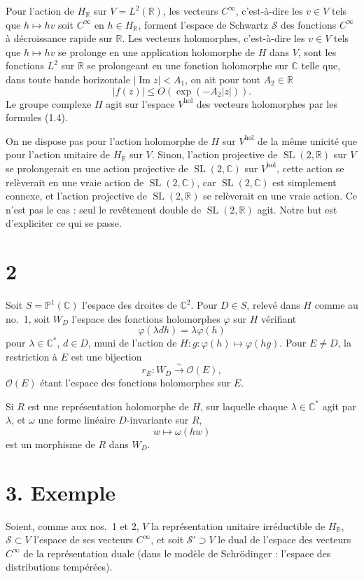 \documentclass[11pt]{article}
\newcommand{\C}{\mathbb C}
\newcommand{\R}{\mathbb R}
\newcommand{\cO}{\mathcal O}
\DeclareMathOperator{\SL}{SL}
\begin{document}
Pour l'action de $H_\R$ sur $V=L^2(\R)$, les vecteurs $C^\infty$, c'est-à-dire les $v\in V$ tels que $h\mapsto hv$ soit $C^\infty$ en $h\in H_\R$, forment l'espace de Schwartz $\mathscr S$ des fonctions $C^\infty$ à décroissance rapide sur $\R$. Les vecteurs holomorphes, c'est-à-dire les $v\in V$ tels que $h\mapsto hv$ se prolonge en une application holomorphe de $H$ dans $V$, sont les fonctions $L^2$ sur $\R$ se prolongeant en une fonction holomorphe sur $\C$ telle que, dans toute bande horizontale $|\operatorname{Im}z|<A_1$, on ait pour tout $A_2\in\R$
\[
|f(z)|\le O(\exp(-A_2|z|)).
\]
Le groupe complexe $H$ agit sur l'espace $V^{\mathrm{hol}}$ des vecteurs holomorphes par les formules (1.4).

On ne dispose pas pour l'action holomorphe de $H$ sur $V^{\mathrm{hol}}$ de la même unicité que pour l'action unitaire de $H_\R$ sur $V$. Sinon, l'action projective de $\SL(2,\R)$ sur $V$ se prolongerait en une action projective de $\SL(2,\C)$ sur $V^{\mathrm{hol}}$, cette action se relèverait en une vraie action de $\SL(2,\C)$, car $\SL(2,\C)$ est simplement connexe, et l'action projective de $\SL(2,\R)$ se relèverait en une vraie action. Ce n'est pas le cas : seul le revêtement double de $\SL(2,\R)$ agit. Notre but est d'expliciter ce qui se passe.

\section*{2}
Soit $S=\mathbb P^1(\C)$ l'espace des droites de $\C^2$. Pour $D\in S$, relevé dans $H$ comme au no.~1, soit $W_D$ l'espace des fonctions holomorphes $\varphi$ sur $H$ vérifiant
\[
\varphi(\lambda d h)=\lambda\varphi(h)
\]
pour $\lambda\in\C^*$, $d\in D$, muni de l'action de $H:g:\varphi(h)\mapsto\varphi(hg)$. Pour $E\ne D$, la restriction à $E$ est une bijection
\begin{equation}\tag{2.1}
r_E:W_D\xrightarrow{\sim}\cO(E),
\end{equation}
$\cO(E)$ étant l'espace des fonctions holomorphes sur $E$.

Si $R$ est une représentation holomorphe de $H$, sur laquelle chaque $\lambda\in\C^*$ agit par $\lambda$, et $\omega$ une forme linéaire $D$-invariante sur $R$,
\begin{equation}\tag{2.2}
w\longmapsto\omega(hw)
\end{equation}
est un morphisme de $R$ dans $W_D$.

\section*{3. Exemple}
Soient, comme aux nos.~1 et 2, $V$ la représentation unitaire irréductible de $H_\R$, $\mathscr S\subset V$ l'espace de ses vecteurs $C^\infty$, et soit $\mathscr S'\supset V$ le dual de l'espace des vecteurs $C^\infty$ de la représentation duale (dans le modèle de Schrödinger : l'espace des distributions tempérées).
\end{document}
